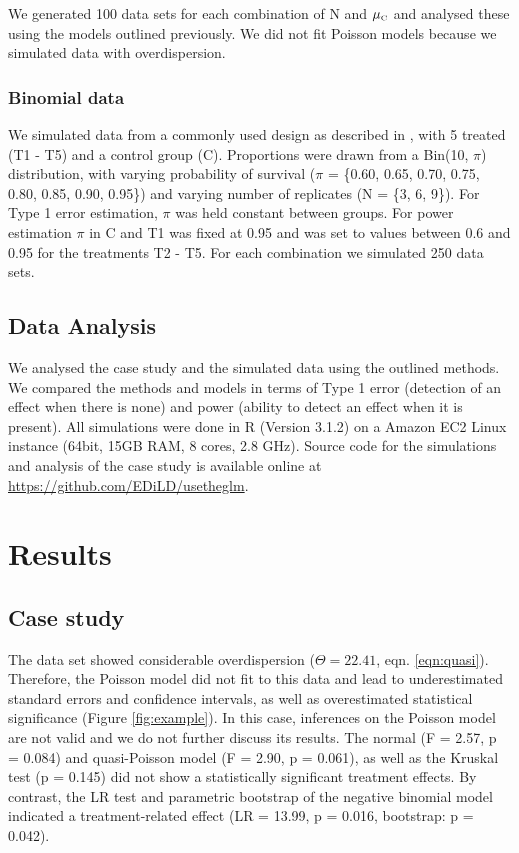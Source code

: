 \documentclass[twocolumn, natbib]{svjour3}
\begin{document}
We generated 100 data sets for each combination of N and $\mu_\text{\tiny C}$ and analysed these using the models outlined previously.
We did not fit Poisson models because we simulated data with overdispersion.


\subsubsection{Binomial data}
We simulated data from a commonly used design as described in \citet{weber_short-term_1989}, with 5 treated (T1 - T5) and a control group (C). 
Proportions were drawn from a Bin(10, $\pi$) distribution, with varying probability of survival ($\pi$ = \{0.60, 0.65, 0.70, 0.75, 0.80, 0.85, 0.90, 0.95\}) and varying number of replicates (N = \{3, 6, 9\}).
For Type 1 error estimation, $\pi$ was held constant between groups.
For power estimation $\pi$ in C and T1 was fixed at 0.95 and was set to values between 0.6 and 0.95 for the treatments T2 - T5. 
For each combination we simulated 250 data sets. 

\subsection{Data Analysis}
We analysed the case study and the simulated data using the outlined methods.
We compared the methods and models in terms of Type 1 error (detection of an effect when there is none) and power (ability to detect an effect when it is present).
All simulations were done in R (Version 3.1.2) \citep{r_core_team_r:_2014} on a Amazon EC2 Linux instance (64bit, 15GB RAM, 8 cores, 2.8 GHz).
Source code for the simulations and analysis of the case study is available online at \url{https://github.com/EDiLD/usetheglm}.



\section{Results}
\label{sec:results}
\subsection{Case study}
The data set showed considerable overdispersion ($\Theta = 22.41$, eqn. \ref{eqn:quasi}).
Therefore, the Poisson model did not fit to this data and lead to underestimated standard errors and confidence intervals, as well as overestimated statistical significance (Figure \ref{fig:example}).
In this case, inferences on the Poisson model are not valid and we do not further discuss its results.
The normal (F = 2.57, p = 0.084) and quasi-Poisson model (F = 2.90, p = 0.061), as well as the Kruskal test (p =  0.145) did not show a statistically significant treatment effects.
By contrast, the LR test and parametric bootstrap of the negative binomial model indicated a treatment-related effect (LR = 13.99, p = 0.016, bootstrap: p = 0.042).
\end{document}
